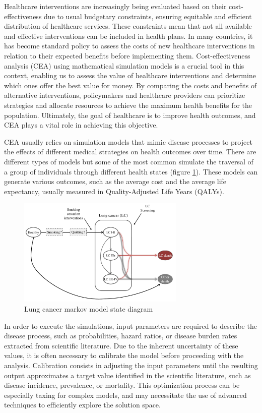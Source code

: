 \documentclass[sn-mathphys,Numbered]{sn-jnl}%
\begin{document}
Healthcare interventions are increasingly being evaluated based on their cost-effectiveness due to usual budgetary constraints, ensuring equitable and efficient distribution of healthcare services. These constraints mean that not all available and effective interventions can be included in health plans. In many countries, it has become standard policy to assess the costs of new healthcare interventions in relation to their expected benefits before implementing them. Cost-effectiveness analysis (CEA) using mathematical simulation models is a crucial tool in this context, enabling us to assess the value of healthcare interventions and determine which ones offer the best value for money\cite{drummond}. By comparing the costs and benefits of alternative interventions, policymakers and healthcare providers can prioritize strategies and allocate resources to achieve the maximum health benefits for the population. Ultimately, the goal of healthcare is to improve health outcomes, and CEA plays a vital role in achieving this objective\cite{levin}.

CEA usually relies on simulation models that mimic disease processes to project the effects of different medical strategies on health outcomes over time\cite{applied_he}. There are different types of models but some of the most common simulate the traversal of a group of individuals through different health states (figure \ref{fig:lung_model}). These models can generate various outcomes, such as the average cost and the average life expectancy, usually measured in Quality-Adjusted Life Years (QALYs)\cite{qalys}.

\begin{figure}[h!]
	\centering	
	\includegraphics[width=80mm]{figs/lungmodel_r.pdf}		
	\caption{Lung cancer markov model state diagram}	
	\label{fig:lung_model}	
\end{figure}

In order to execute the simulations, input parameters are required to describe the disease process, such as probabilities, hazard ratios, or disease burden rates extracted from scientific literature. Due to the inherent uncertainty of these values, it is often necessary to calibrate the model before proceeding with the analysis. Calibration consists in adjusting the input parameters until the resulting output approximates a target value identified in the scientific literature, such as disease incidence, prevalence, or mortality. This optimization process can be especially taxing for complex models, and may necessitate the use of advanced techniques to efficiently explore the solution space.
\end{document}
